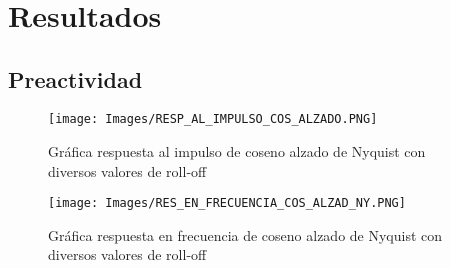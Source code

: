 \documentclass[lettersize,journal]{IEEEtran}
\begin{document}
\\

\\
\\
\vspace{2mm}

\section{Resultados}\label{sec:resultados}

\subsection{Preactividad}
\begin{figure}[h!]
    \centering
    \texttt{[image: Images/RESP\_AL\_IMPULSO\_COS\_ALZADO.PNG]}
    \caption{Gráfica respuesta al impulso de coseno alzado de Nyquist con diversos valores de roll-off}
    \label{fig:my_label}
\end{figure}

\begin{figure}[h!]
    \centering
    \texttt{[image: Images/RES\_EN\_FRECUENCIA\_COS\_ALZAD\_NY.PNG]}
    \caption{Gráfica respuesta en frecuencia de coseno alzado de Nyquist con diversos valores de roll-off}
    \label{fig:my_label}
\end{figure}

\newpage
\end{document}
